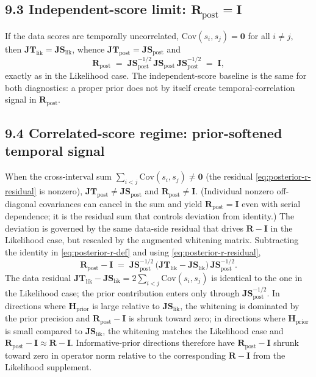 \documentclass[11pt]{article}
\begin{document}
\subsection*{9.3 Independent-score limit: $\mathbf R_{\mathrm{post}} = \mathbf I$}

If the data scores are temporally uncorrelated, $\mathrm{Cov}(s_i, s_j) = \mathbf 0$ for all $i \neq j$, then $\mathbf{JT}_{\mathrm{lik}} = \mathbf{JS}_{\mathrm{lik}}$, whence $\mathbf{JT}_{\mathrm{post}} = \mathbf{JS}_{\mathrm{post}}$ and
\begin{equation}
\mathbf R_{\mathrm{post}}
\;=\;
\mathbf{JS}_{\mathrm{post}}^{-1/2}\,
\mathbf{JS}_{\mathrm{post}}\,
\mathbf{JS}_{\mathrm{post}}^{-1/2}
\;=\;
\mathbf I,
\label{eq:posterior-r-independent}
\end{equation}
exactly as in the Likelihood case. The independent-score baseline is the same for both diagnostics: a proper prior does not by itself create temporal-correlation signal in $\mathbf R_{\mathrm{post}}$.

\subsection*{9.4 Correlated-score regime: prior-softened temporal signal}

When the cross-interval sum $\sum_{i<j}\mathrm{Cov}(s_i, s_j) \neq \mathbf 0$ (the residual \eqref{eq:posterior-r-residual} is nonzero), $\mathbf{JT}_{\mathrm{post}} \neq \mathbf{JS}_{\mathrm{post}}$ and $\mathbf R_{\mathrm{post}} \neq \mathbf I$. (Individual nonzero off-diagonal covariances can cancel in the sum and yield $\mathbf R_{\mathrm{post}} = \mathbf I$ even with serial dependence; it is the residual sum that controls deviation from identity.) The deviation is governed by the same data-side residual that drives $\mathbf R - \mathbf I$ in the Likelihood case, but rescaled by the augmented whitening matrix. Subtracting the identity in \eqref{eq:posterior-r-def} and using \eqref{eq:posterior-r-residual},
\begin{equation}
\mathbf R_{\mathrm{post}} - \mathbf I
\;=\;
\mathbf{JS}_{\mathrm{post}}^{-1/2}\,
\bigl(\mathbf{JT}_{\mathrm{lik}} - \mathbf{JS}_{\mathrm{lik}}\bigr)\,
\mathbf{JS}_{\mathrm{post}}^{-1/2}.
\label{eq:posterior-r-deviation}
\end{equation}
The data residual $\mathbf{JT}_{\mathrm{lik}} - \mathbf{JS}_{\mathrm{lik}} = 2\sum_{i<j}\mathrm{Cov}(s_i,s_j)$ is identical to the one in the Likelihood case; the prior contribution enters only through $\mathbf{JS}_{\mathrm{post}}^{-1/2}$. In directions where $\mathbf H_{\mathrm{prior}}$ is large relative to $\mathbf{JS}_{\mathrm{lik}}$, the whitening is dominated by the prior precision and $\mathbf R_{\mathrm{post}} - \mathbf I$ is shrunk toward zero; in directions where $\mathbf H_{\mathrm{prior}}$ is small compared to $\mathbf{JS}_{\mathrm{lik}}$, the whitening matches the Likelihood case and $\mathbf R_{\mathrm{post}} - \mathbf I \approx \mathbf R - \mathbf I$. Informative-prior directions therefore have $\mathbf R_{\mathrm{post}} - \mathbf I$ shrunk toward zero in operator norm relative to the corresponding $\mathbf R - \mathbf I$ from the Likelihood supplement.
\end{document}
